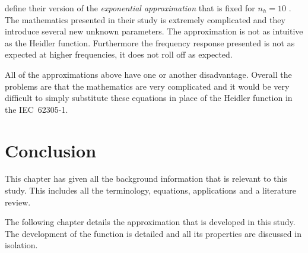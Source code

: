 \citeauthor{Vujevic2009} define their version of the \textit{exponential approximation} that is fixed for $n_h=10$ \cite{Vujevic2009,Vujevic2010a}. The mathematics presented in their study is extremely complicated and they introduce several new unknown parameters. The approximation is not as intuitive as the Heidler function. Furthermore the frequency response presented is not as expected at higher frequencies, it does not roll off as expected.

All of the approximations above have one or another disadvantage. Overall the problems are that the mathematics are very complicated and it would be very difficult to simply substitute these equations in place of the Heidler function in the IEC~62305-1.


\section{Conclusion}
\label{sec:background_conclusion}
This chapter has given all the background information that is relevant to this study. This includes all the terminology, equations, applications and a literature review.

The following chapter details the approximation that is developed in this study. The development of the function is detailed and all its properties are discussed in isolation.
